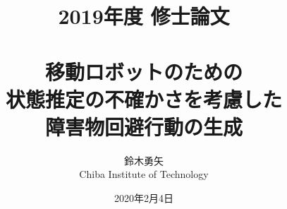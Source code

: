 \documentclass[a4paper,12pt,uplatex]{jsbook}
\begin{document}
\title{2019年度 修士論文\\
　\\
移動ロボットのための\\
状態推定の不確かさを考慮した\\
障害物回避行動の生成}
\author{鈴木勇矢\\
Chiba Institute of Technology}
\date{2020年2月4日}

\maketitle


\tableofcontents

\cleardoublepage
{}








% 
% 
% 
% 
% 
% 




\newpage
\end{document}

